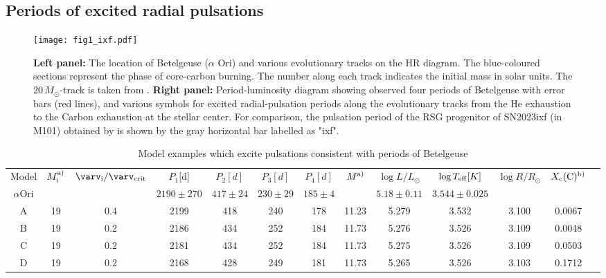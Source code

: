 \documentclass[fleqn,usenatbib]{mnras}
\begin{document}
\subsection{Periods of excited radial pulsations}
\begin{figure}
	\texttt{[image: fig1\_ixf.pdf]} %
    \caption{{\bf Left panel:} The location
     of Betelgeuse ($\alpha$ Ori) and various
     evolutionary tracks on the HR diagram.
     The blue-coloured sections represent the phase of core-carbon burning.
      The number along each track indicates the initial mass in solar units. 
      The $20\,M_\odot$-track is taken from \citet{Yusof2022}.
    {\bf Right panel:} Period-luminosity diagram showing observed four periods of Betelgeuse with error bars (red lines), and various symbols for excited radial-pulsation periods along the evolutionary tracks from the He exhaustion to the Carbon exhaustion at the stellar center.
    For comparison, the pulsation period of the RSG progenitor of SN2023ixf (in M101) obtained by \citet{Jencson2023} is shown by the gray horizontal bar labelled as "ixf". 
	}
  \label{fig:te_lum_peri}
\end{figure}

\begin{table*}
	\begin{center}
	\caption{Model examples which excite pulsations consistent with periods of Betelgeuse }
	\label{tab:models}
	\begin{tabular}{ccccccccccccc} %
      \hline 
  Model &   $M_{\rm i}^{\rm a)}$ & $\varv_{\rm i}/\varv_{\rm crit}$ & $P_1$[d] & $P_2[d]$ & $P_3[d]$ & $P_4[d]$ & $M^{\rm a)}$ & $\log L/L_\odot$ & $\log T_{\rm eff}[K]$ & $\log R/R_\odot$& $X_{\rm c}({\rm C})^{\rm b)}$ \\ 
    $\alpha$Ori   &  &  & $2190 \pm 270$ & $417 \pm 24$ & $230 \pm 29$ & $185 \pm 4$ &  &
         $5.18\pm0.11$ & $3.544\pm 0.025$ \\ 
      \hline
   A &   19 & 0.4 & 2199 & 418 & 240 & 178 & 11.23 & 5.279 & 3.532 & 3.100& 0.0067 \\ 
      \hline
   B &   19 & 0.2 & 2186 & 434 & 252 & 184 & 11.73 & 5.276 & 3.526 & 3.109 
   & 0.0048  \\ 
   C &   19 & 0.2 & 2181 & 434 & 252 & 184 & 11.73 & 5.275 & 3.526 & 3.109 
   & 0.0503  \\ 
  D &  19 & 0.2 & 2168 & 428 & 249 & 181 & 11.73 & 5.265 & 3.526 & 3.103  
  & 0.1712 \\ %
     \hline
     	\end{tabular}\\
 \end{center}
\end{table*}
\end{document}
